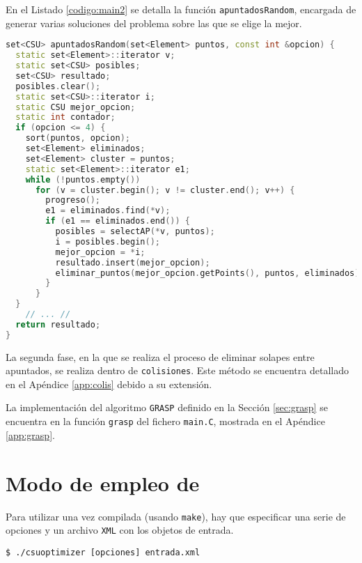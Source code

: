 En el Listado \ref{codigo:main2} se detalla la función \texttt{apuntadosRandom},
encargada de generar varias soluciones del problema sobre las que se elige la
mejor.

\begin{lstlisting}[float=tpb,
                   language=C++, numbers=none,basicstyle=\ttfamily\footnotesize,
                   caption={Código de la función que genera soluciones
                   aleatorias},
                   label={codigo:main2}]
set<CSU> apuntadosRandom(set<Element> puntos, const int &opcion) {
  static set<Element>::iterator v;
  static set<CSU> posibles;
  set<CSU> resultado;
  posibles.clear();
  static set<CSU>::iterator i;
  static CSU mejor_opcion;
  static int contador;
  if (opcion <= 4) {
    sort(puntos, opcion);
    set<Element> eliminados;
    set<Element> cluster = puntos;
    static set<Element>::iterator e1;
    while (!puntos.empty()) 
      for (v = cluster.begin(); v != cluster.end(); v++) { 
        progreso();
        e1 = eliminados.find(*v);
        if (e1 == eliminados.end()) {
          posibles = selectAP(*v, puntos);
          i = posibles.begin(); 
          mejor_opcion = *i; 
          resultado.insert(mejor_opcion);
          eliminar_puntos(mejor_opcion.getPoints(), puntos, eliminados); 
        }
      }
  }
	// ... //
  return resultado;
}
\end{lstlisting}

La segunda fase, en la que se realiza el proceso de eliminar solapes entre
apuntados, se realiza dentro de \texttt{colisiones}. Este método se encuentra
detallado en el Apéndice \ref{app:colis} debido a su extensión.

La implementación del algoritmo \texttt{GRASP} definido en la Sección
\ref{sec:grasp} se encuentra en la función \texttt{grasp} del fichero
\texttt{main.C}, mostrada en el Apéndice \ref{app:grasp}.

\section{Modo de empleo de \CSUO{}} \label{sec:uso_app}

Para utilizar \CSUO{} una vez compilada (usando \texttt{make}),
hay que especificar una serie de opciones y un archivo \texttt{XML} con los
objetos de entrada.

\begin{lstlisting}[numbers=none]
$ ./csuoptimizer [opciones] entrada.xml
\end{lstlisting}

